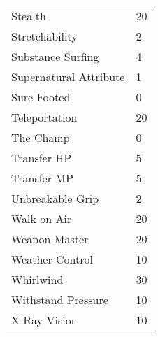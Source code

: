 \documentclass[twoside]{book}
\begin{document}
\begin{longtable}{p{1.25in}l}
  \raggedright
           Stealth 
  &
   20 
  \tabularnewline
      
  \raggedright
           Stretchability 
  &
   2 
  \tabularnewline
      
  \raggedright
           Substance Surfing 
  &
   4 
  \tabularnewline
      
  \raggedright
           Supernatural Attribute 
  &
   1 
  \tabularnewline
      
  \raggedright
           Sure Footed 
  &
   0 
  \tabularnewline
      
  \raggedright
           Teleportation 
  &
   20 
  \tabularnewline
      
  \raggedright
           The Champ 
  &
   0 
  \tabularnewline
      
  \raggedright
           Transfer HP 
  &
   5 
  \tabularnewline
      
  \raggedright
           Transfer MP 
  &
   5 
  \tabularnewline
      
  \raggedright
           Unbreakable Grip 
  &
   2 
  \tabularnewline
      
  \raggedright
           Walk on Air 
  &
   20 
  \tabularnewline
      
  \raggedright
           Weapon Master 
  &
   20 
  \tabularnewline
      
  \raggedright
           Weather Control 
  &
   10 
  \tabularnewline
      
  \raggedright
           Whirlwind 
  &
   30 
  \tabularnewline
      
  \raggedright
           Withstand Pressure 
  &
   10 
  \tabularnewline
      
  \raggedright
           X-Ray Vision 
  &
   10 
  \tabularnewline
      
\end{longtable}
    
\end{document}
